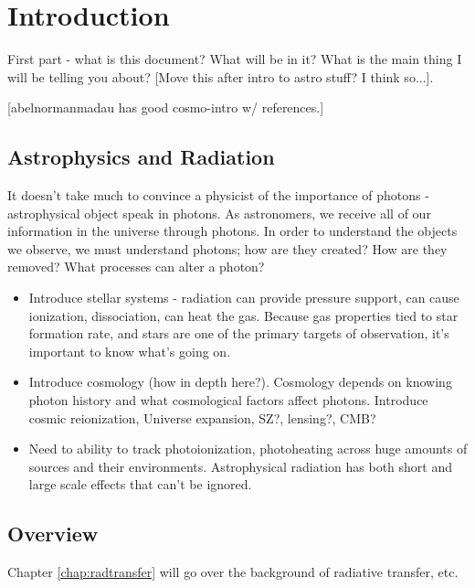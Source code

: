 \pagestyle{fancy}
\headheight 20pt
\chead{}
\lfoot{}
\cfoot{\thepage}
\rfoot{}
\renewcommand{\headrulewidth}{0.1pt}
\renewcommand{\footrulewidth}{0.1pt}

\chapter{Introduction}
\label{chap:intro} 
\thispagestyle{fancy} 

First part - what is this document? What will be in it? What is the main thing I will be telling you about? [Move this after intro to astro stuff? I think so...].


[abelnormanmadau has good cosmo-intro w/ references.]

\section{Astrophysics and Radiation}
\label{sec:astroandrad}

It doesn't take much to convince a physicist of the importance of photons - astrophysical object speak in photons. As astronomers, we receive all of our information in the universe through photons. In order to understand the objects we observe, we must understand photons; how are they created? How are they removed? What processes can alter a photon?

\begin{itemize}
\item Introduce stellar systems -  radiation can provide pressure support, can cause ionization, dissociation, can heat the gas. Because gas properties tied to star formation rate, and stars are one of the primary targets of observation, it's important to know what's going on.
\item Introduce cosmology (how in depth here?). Cosmology depends on knowing photon history and what cosmological factors affect photons. Introduce cosmic reionization, Universe expansion, SZ?, lensing?, CMB?
\item Need to ability to track photoionization, photoheating across huge amounts of sources and their environments. Astrophysical radiation has both short and large scale effects that can't be ignored.
\end{itemize}

%
%
%
%
% 
%
%
% 
%


\section{Overview}

Chapter \ref{chap:radtransfer} will go over the background of radiative transfer, etc.
